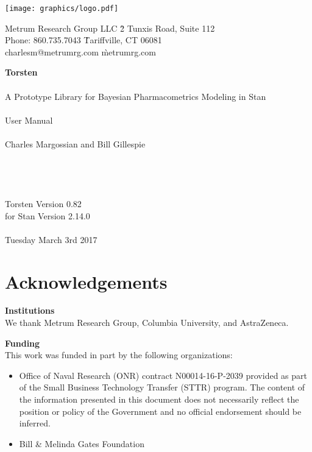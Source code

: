 \documentclass[11pt]{amsart}
\let\oldsection\section
\renewcommand\section{\clearpage\oldsection}
\begin{document}
\begin{center}
\texttt{[image: graphics/logo.pdf]}\\
\textcolor{MRGGreen}{\sf
\begin{tabbing}
Metrum Research Group LLC \` 2 Tunxis Road, Suite 112 \\
Phone: 860.735.7043 \` Tariffville, CT 06081 \\
charlesm@metrumrg.com \` metrumrg.com \\
\end{tabbing}
}
{\Huge \textbf{Torsten} \\ \ \\  \huge A Prototype Library for Bayesian Pharmacometrics Modeling in Stan \\ \ \\
User Manual \\ \ \\ 
\Large Charles Margossian and Bill Gillespie \\ \ \\ \ \\ \ \\ \ \\
Torsten Version 0.82 \\ for Stan Version 2.14.0 \\ \ \\ 
\large Tuesday March 3rd 2017 }
\end{center}

\clearpage

\tableofcontents

\section*{Acknowledgements}

{\bf Institutions} \ \\
We thank Metrum Research Group, Columbia University, and AstraZeneca.

{\bf Funding}  \ \\
This work was funded in part by the following organizations:
\begin{itemize}
  \item Office of Naval Research (ONR) contract N00014-16-P-2039 provided as part  of the Small Business Technology Transfer (STTR) program. The content of the information presented in this document does not necessarily reflect the position or policy of the Government and no official endorsement should be inferred.
  \item Bill \& Melinda Gates Foundation
\end{itemize}
\end{document}
